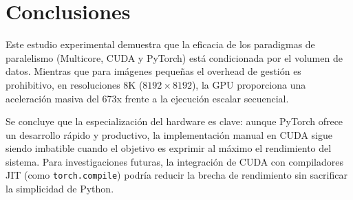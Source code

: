 \section{Conclusiones}
Este estudio experimental demuestra que la eficacia de los paradigmas de paralelismo (Multicore, CUDA y PyTorch) está condicionada por el volumen de datos. Mientras que para imágenes pequeñas el overhead de gestión es prohibitivo, en resoluciones 8K ($8192 \times 8192$), la GPU proporciona una aceleración masiva del 673x frente a la ejecución escalar secuencial. 

Se concluye que la especialización del hardware es clave: aunque PyTorch ofrece un desarrollo rápido y productivo, la implementación manual en CUDA sigue siendo imbatible cuando el objetivo es exprimir al máximo el rendimiento del sistema. Para investigaciones futuras, la integración de CUDA con compiladores JIT (como \texttt{torch.compile}) podría reducir la brecha de rendimiento sin sacrificar la simplicidad de Python.